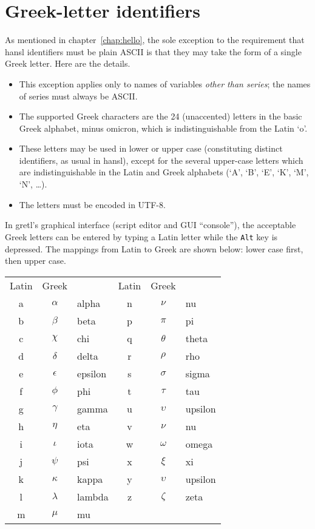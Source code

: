 \chapter{Greek-letter identifiers}
\label{chap:greeks}

As mentioned in chapter~\ref{chap:hello}, the sole exception to the
requirement that hansl identifiers must be plain ASCII is that they
may take the form of a single Greek letter. Here are the details.

\begin{itemize}
\item This exception applies only to names of variables \textit{other
    than series}; the names of series must always be ASCII.
\item The supported Greek characters are the 24 (unaccented) letters
  in the basic Greek alphabet, minus omicron, which is
  indistinguishable from the Latin `o'.
\item These letters may be used in lower or upper case (constituting
  distinct identifiers, as usual in hansl), except for the several
  upper-case letters which are indistinguishable in the Latin and
  Greek alphabets (`A', `B', `E', `K', `M', `N', \dots).
\item The letters must be encoded in UTF-8.
\end{itemize}

In gretl's graphical interface (script editor and GUI ``console''),
the acceptable Greek letters can be entered by typing a Latin letter
while the \texttt{Alt} key is depressed. The mappings from Latin to
Greek are shown below: lower case first, then upper case.

\begin{center}
  \begin{tabular}{ccl@{\hskip 4em}ccl}
    Latin & Greek & & Latin & Greek \\[4pt]
    a & $\alpha$ & alpha & n & $\nu$ & nu \\
    b & $\beta$ & beta & p & $\pi$ & pi \\
    c & $\chi$ & chi & q & $\theta$ & theta \\
    d & $\delta$ & delta & r & $\rho$ & rho \\
    e & $\epsilon$ & epsilon & s & $\sigma$ & sigma \\
    f & $\phi$ & phi & t & $\tau$ & tau \\
    g & $\gamma$ & gamma & u & $\upsilon$ & upsilon \\
    h & $\eta$ & eta & v & $\nu$ & nu \\
    i & $\iota$ & iota & w & $\omega$ & omega \\
    j & $\psi$ & psi & x & $\xi$ & xi \\
    k & $\kappa$ & kappa & y & $\upsilon$ & upsilon \\
    l & $\lambda$ & lambda & z & $\zeta$ & zeta \\
    m & $\mu$ & mu \\
  \end{tabular}
\end{center}

